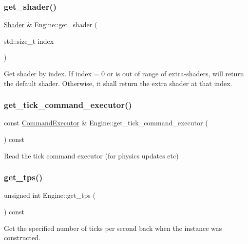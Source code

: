 \subsubsection{\texorpdfstring{get\+\_\+shader()}{get\_shader()}}
{\footnotesize\ttfamily \mbox{\hyperlink{class_shader}{Shader}} \& Engine\+::get\+\_\+shader (\begin{DoxyParamCaption}\item[{std\+::size\+\_\+t}]{index }\end{DoxyParamCaption})}

Get shader by index. If index = 0 or is out of range of extra-\/shaders, will return the default shader. Otherwise, it shall return the extra shader at that index. \mbox{\label{class_engine_a457c2c3adbc7baa8b2903b139882fc79}} 
\subsubsection{\texorpdfstring{get\+\_\+tick\+\_\+command\+\_\+executor()}{get\_tick\_command\_executor()}}
{\footnotesize\ttfamily const \mbox{\hyperlink{class_command_executor}{Command\+Executor}} \& Engine\+::get\+\_\+tick\+\_\+command\+\_\+executor (\begin{DoxyParamCaption}{ }\end{DoxyParamCaption}) const}

Read the tick command executor (for physics updates etc) \mbox{\label{class_engine_afac8cc0ad1a0c97024dc61683588f22c}} 
\subsubsection{\texorpdfstring{get\+\_\+tps()}{get\_tps()}}
{\footnotesize\ttfamily unsigned int Engine\+::get\+\_\+tps (\begin{DoxyParamCaption}{ }\end{DoxyParamCaption}) const}

Get the specified number of ticks per second back when the instance was constructed. \mbox{\label{class_engine_ab53fa08b25bde47cf3fd63956669fc72}} 
